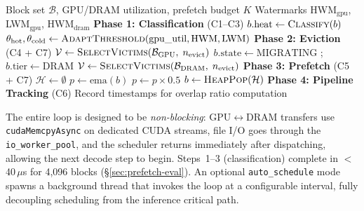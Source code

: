 \documentclass[conference]{IEEEtran}
\begin{document}
\begin{algorithm}[t]
\caption{Per-Step Scheduling Loop (C8: Tiered Manager)}
\label{alg:schedule}
\begin{algorithmic}[1]
\Require Block set $\mathcal{B}$, GPU/DRAM utilization, prefetch budget $K$
\Require Watermarks HWM$_{\text{gpu}}$, LWM$_{\text{gpu}}$, HWM$_{\text{dram}}$
\Statex
\Statex \textbf{Phase 1: Classification} (C1--C3)
 
    \State $b.\text{heat} \gets \Call{Classify}{b}$ 
\EndFor
\State $\theta_{\text{hot}}, \theta_{\text{cold}} \gets \Call{AdaptThreshold}{\text{gpu\_util}, \text{HWM}, \text{LWM}}$ 
\Statex
\Statex \textbf{Phase 2: Eviction} (C4 + C7)
 
    \State $\mathcal{V} \gets \Call{SelectVictims}{\mathcal{B}_{\text{GPU}},\; n_{\text{evict}}}$ 
        \State {}
        \State $b.\text{state} \gets \text{MIGRATING}$
        \State {} 
        \State {}; $b.\text{tier} \gets \text{DRAM}$
        \State {}
    \EndFor
\EndIf
{} 
    \State $\mathcal{V} \gets \Call{SelectVictims}{\mathcal{B}_{\text{DRAM}},\; n_{\text{evict}}}$
    \State {} 
\EndIf
\Statex
\Statex \textbf{Phase 3: Prefetch} (C5 + C7)
\State $\mathcal{H} \gets \emptyset$ 
    \State $p \gets \text{ema}(b)$ 
     $p \gets p \times 0.5$ 
    \EndIf
    \State {}
\EndFor
{} 
    \State $b \gets \Call{HeapPop}{\mathcal{H}}$
    \State {} 
\EndFor
\Statex
\Statex \textbf{Phase 4: Pipeline Tracking} (C6)
\State Record timestamps for overlap ratio computation
\end{algorithmic}
\end{algorithm}

The entire loop is designed to be \emph{non-blocking}: GPU$\leftrightarrow$DRAM transfers use \texttt{cudaMemcpyAsync} on dedicated CUDA streams, file I/O goes through the \texttt{io\_worker\_pool}, and the scheduler returns immediately after dispatching, allowing the next decode step to begin. Steps~1--3 (classification) complete in $<$40\,$\mu$s for 4,096 blocks (\S\ref{sec:prefetch-eval}). An optional \texttt{auto\_schedule} mode spawns a background thread that invokes the loop at a configurable interval, fully decoupling scheduling from the inference critical path.
\end{document}
